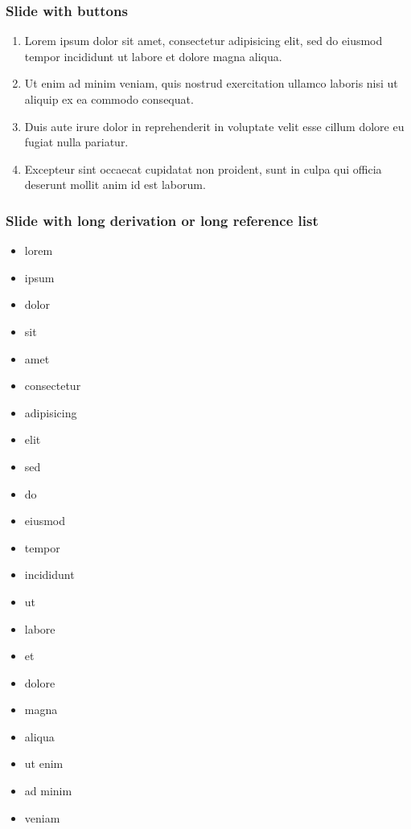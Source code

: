 \documentclass[11pt, aspectratio=169, xcolor={dvipsnames}, usepdftitle=false]{beamer}
\begin{document}
\begin{frame}[label=firstSlide]
\frametitle{Slide with buttons}
\begin{enumerate}
\item Lorem ipsum dolor sit amet, consectetur adipisicing elit, sed do eiusmod
tempor incididunt ut labore et dolore magna aliqua.
\item  Ut enim ad minim veniam, quis nostrud exercitation ullamco laboris nisi ut aliquip ex ea commodo consequat. 
\item Duis aute irure dolor in reprehenderit in voluptate velit esse
cillum dolore eu fugiat nulla pariatur. 
\item Excepteur sint occaecat cupidatat non proident, sunt in culpa qui officia deserunt mollit anim id est laborum.
\end{enumerate}
\hyperlink{backupSlide}{}
\hyperlink{anotherBackupSlide}{}
\end{frame}

\begin{frame}[allowframebreaks=0.8]
\frametitle{Slide with long derivation or long reference list}
\begin{itemize}
\item lorem 
\item ipsum 
\item dolor 
\item sit 
\item amet
\item consectetur 
\item adipisicing 
\item elit
\item sed
\item do
\item eiusmod
\item tempor
\item incididunt
\item ut
\item labore
\item et 
\item dolore 
\item magna 
\item aliqua
\item ut enim
\item ad minim 
\item veniam
\end{itemize}
\end{frame}
\end{document}

